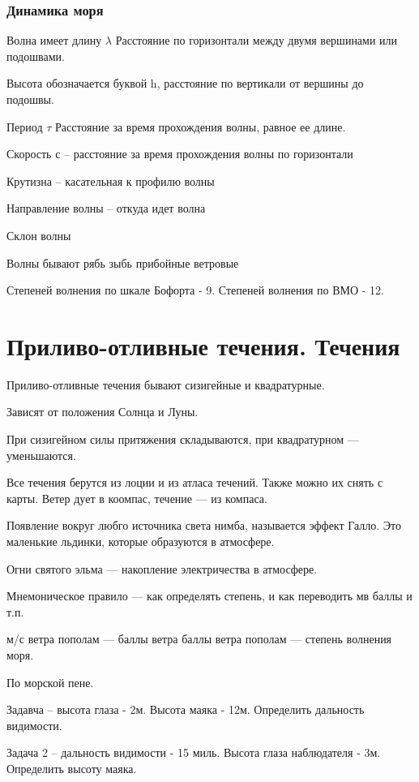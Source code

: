 \documentclass{article}        %
\begin{document}
\subsubsection{Динамика моря}
\begin{definition}
Волна имеет длину $\lambda $
Расстояние по горизонтали между двумя вершинами или подошвами. 

Высота обозначается буквой h, расстояние по вертикали от вершины до подошвы.

Период $\tau$
Расстояние за время прохождения волны, равное ее длине.

Скорость с -- расстояние за время прохождения волны по горизонтали

Крутизна -- касательная к профилю волны

Направление волны -- откуда идет волна
\end{definition}

Склон волны

Волны бывают
	рябь
	зыбь
	прибойные
	ветровые

Степеней волнения по шкале Бофорта - 9. 
Степеней волнения по ВМО - 12.



\section{Приливо-отливные течения. Течения}
Приливо-отливные течения бывают сизигейные и квадратурные.

Зависят от положения Солнца и Луны.

При сизигейном силы притяжения складываются, при квадратурном --- уменьшаются.

Все течения берутся из лоции и из атласа течений. Также можно их снять с карты. Ветер дует в коомпас, течение --- из компаса.

Появление вокруг любго источника света нимба, называется эффект Галло. Это маленькие льдинки, которые образуются в атмосфере.

Огни святого эльма --- накопление электричества в атмосфере. 

Мнемоническое правило --- как определять степень, и как переводить м\с в баллы и т.п.

м/с ветра пополам --- баллы ветра
баллы ветра пополам --- степень волнения моря.

По морской пене. 

Задавча -- высота глаза - 2м. Высота маяка - 12м. Определить дальность видимости.

Задача 2 -- дальность видимости - 15 миль. Высота глаза наблюдателя - 3м. Определить высоту маяка.
\end{document}
